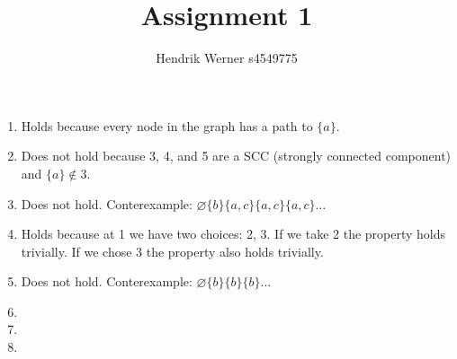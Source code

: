 \documentclass[12pt, a4paper]{article}
\title{Assignment 1}
\author{Hendrik Werner s4549775}
\begin{document}
\maketitle

\section{} %
\begin{enumerate}[a]
	\item %
	Holds because every node in the graph has a path to $\{a\}$.
	\item %
	Does not hold because 3, 4, and 5 are a SCC (strongly connected component) and $\{a\} \not \in 3$.
	\item %
	Does not hold. Conterexample: $\varnothing \{b\} \{a, c\} \{a, c\} \{a, c\} \dots$
	\item %
	Holds because at 1 we have two choices: 2, 3. If we take 2 the property holds trivially. If we chose 3 the property also holds trivially.
	\item %
	Does not hold. Conterexample: $\varnothing \{b\} \{b\} \{b\} \dots$
	\item %
	\item %
	\item %
\end{enumerate}
\end{document}
